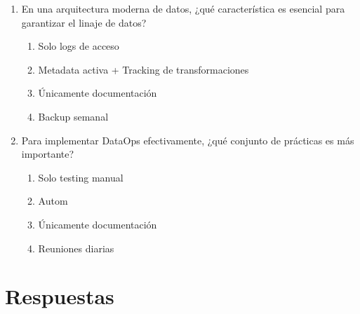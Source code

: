 \documentclass[12pt]{article}
\begin{document}
\begin{enumerate}[label=\arabic*.]
\item En una arquitectura moderna de datos, ¿qué característica es esencial para garantizar el linaje de datos?
\begin{enumerate}
    \item Solo logs de acceso
    \item Metadata activa + Tracking de transformaciones
    \item Únicamente documentación
    \item Backup semanal
\end{enumerate}

\item Para implementar DataOps efectivamente, ¿qué conjunto de prácticas es más importante?
\begin{enumerate}
    \item Solo testing manual
    \item Autom
    \item Únicamente documentación
    \item Reuniones diarias
\end{enumerate}

\end{enumerate}

\newpage
\section*{Respuestas}
\end{document}
